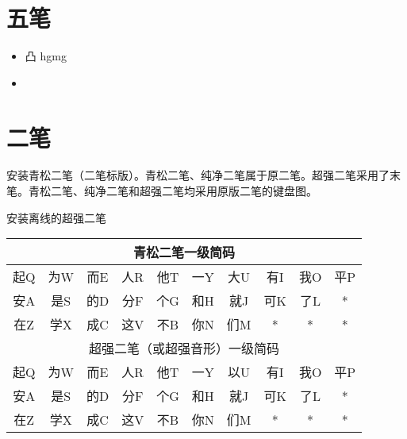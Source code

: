 \section{五笔}
\begin{multicols}{3}
\begin{itemize}
\itemsep0em
\item 凸 hgmg
\item 
\end{itemize}
\end{multicols}

\section{二笔}

 安装青松二笔（二笔标版）。青松二笔、纯净二笔属于原二笔。超强二笔采用了末笔。青松二笔、纯净二笔和超强二笔均采用原版二笔的键盘图。

 安装离线的超强二笔


\begin{tabular}{cccccccccc}
\multicolumn{10}{c}{青松二笔一级简码} \\
\hline
起Q&	为W&	而E&	人R&	他T&	一Y&	大U&	有I&	我O&	平P\\
安A&	是S&	的D&	分F&	个G&	和H&	就J&	可K&	了L&	*\\
在Z&	学X&	成C&	这V&	不B&	你N&	们M&	*&	*&	*\\
\hline
\multicolumn{10}{c}{超强二笔（或超强音形）一级简码} \\
\hline
起Q&	为W&	而E&	人R&	他T&	一Y&	以U&	有I&	我O&	平P\\
安A&	是S&	的D&	分F&	个G&	和H&	就J&	可K&	了L&	*\\
在Z&	学X&	成C&	这V&	不B&	你N&	们M&	*&	*&	*\\
\hline
\end{tabular}

